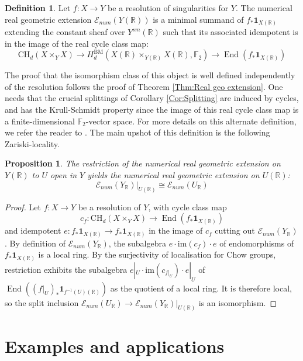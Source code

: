 \documentclass{amsart}
\newtheorem{prop}[thm]{Proposition}
\theoremstyle{definition}
\newtheorem{defi}[thm]{Definition}
\theoremstyle{remark}
\DeclareMathOperator{\End}{End}
\begin{document}
\begin{defi}
Let $f:X\to Y$ be a resolution of singularities for $Y$. The numerical real geometric extension $\mathscr{E}_{num}(Y(\mathbb{R}))$ is a minimal summand of $f_*\mathbf{1}_{X(\mathbb{R})}$ extending the constant sheaf over $Y^{sm}(\mathbb{R})$ such that its associated idempotent is in the image of the real cycle class map:
\[\mathrm{CH}_d(X\times_Y X)\to H^{\mathrm{BM}}_d(X(\mathbb{R})\times_{Y(\mathbb{R})}X(\mathbb{R}),\mathbb{F}_2) \to \End(f_*\mathbf{1}_{X(\mathbb{R})})\]
\end{defi}

The proof that the isomorphism class of this object is well defined independently of the resolution follows the proof of Theorem \ref{Thm:Real geo extension}. One needs that the crucial splittings of Corollary \ref{Cor:Splitting} are induced by cycles, and has the Krull-Schmidt property since the image of this real cycle class map is a finite-dimensional $\mathbb{F}_2$-vector space. For more details on this alternate definition, we refer the reader to \cite{baine2026geometrytiltingcompositionseries}. The main upshot of this definition is the following Zariski-locality.

\begin{prop}
The restriction of the numerical real geometric extension on $Y(\mathbb{R})$ to $U$ open in $Y$ yields the numerical real geometric extension on $U(\mathbb{R})$:
\[\mathscr{E}_{num}(Y_\mathbb{R})|_{U(\mathbb{R})}\cong \mathscr{E}_{num}(U_\mathbb{R})\]
\end{prop}

\begin{proof}
Let $f:X\to Y$ be a resolution of $Y$, with cycle class map 
\[c_f:\mathrm{CH}_d(X\times_{Y} X)\to \End(f_*\mathbf{1}_{X(\mathbb{R})})\] and idempotent $e:f_*\mathbf{1}_{X(\mathbb{R})}\to f_*\mathbf{1}_{X(\mathbb{R})}$ in the image of $c_f$ cutting out $\mathscr{E}_{num}(Y_\mathbb{R})$. By definition of $\mathscr{E}_{num}(Y_\mathbb{R})$, the subalgebra $e\cdot \text{im}(c_f)\cdot e$ of endomorphisms of $f_*\mathbf{1}_{X(\mathbb{R})}$ is a local ring. By the surjectivity of localisation for Chow groups, restriction exhibits the subalgebra $e|_U\cdot \text{im}(c_{f|_U})\cdot e|_U$ of $\End((f|_U)_*\mathbf{1}_{f^{-1}(U)(\mathbb{R})})$ as the quotient of a local ring. It is therefore local, so the split inclusion $\mathscr{E}_{num}(U_\mathbb{R})\to \mathscr{E}_{num}(Y_\mathbb{R})|_{U(\mathbb{R})}$ is an isomorphism.
\end{proof}
\section{Examples and applications}\label{Sec:Examples and applications}
\end{document}
